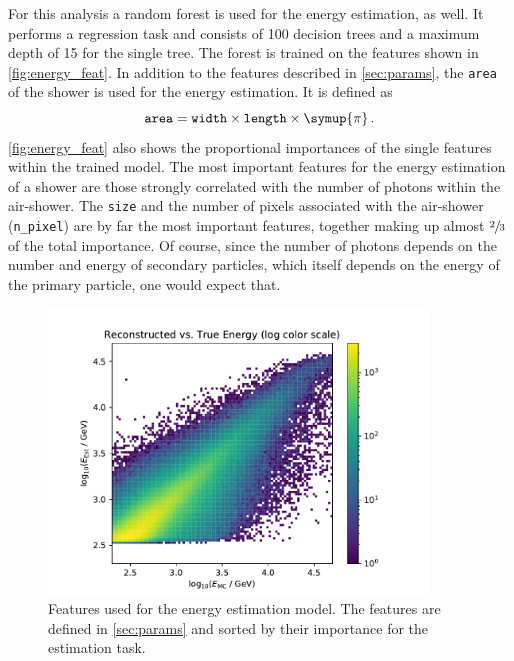 For this analysis a random forest is used for the energy estimation, as well.
It performs a regression task and consists of \num{100} decision trees and a
maximum depth of \num{15} for the single tree. The forest is trained on the
features shown in \autoref{fig:energy_feat}. In addition to the features described in \autoref{sec:params}, the \texttt{area} of the shower is used for the energy estimation. It is defined as
%
\begin{equation}
  \texttt{area} = \texttt{width}\times\texttt{length}\times\symup{\pi}\, .
\end{equation}
%
\autoref{fig:energy_feat} also shows the
proportional importances of the single features within the trained model. The
most important features for the energy estimation of a shower are those
strongly correlated with the number of photons within the air-shower. The
\texttt{size} and the number of pixels associated with the air-shower
(\texttt{n\_pixel}) are by far the most important features, together making up
almost $\sfrac{2}{3}$ of the total importance. Of course, since the number of
photons depends on the number and energy of secondary particles, which itself
depends on the energy of the primary particle, one would expect that.
%
\begin{figure}
  \centering
  \includegraphics[width=0.9\textwidth, page=4]{Plots/results/DBSCAN/energy_performance.pdf}
  \caption{Features used for the energy estimation model. The features are defined in \autoref{sec:params} and sorted by their importance for the estimation task.}
  \label{fig:energy_feat}
\end{figure}
%

